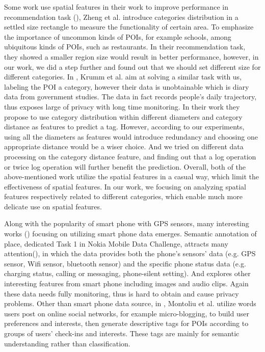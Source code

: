 Some work use spatial features in their work to improve performance in recommendation task (\cite{LocationZheng}), Zheng et al. introduce categories distribution in a settled size rectangle to measure the functionality of certain area. To emphasize the importance of uncommon kinds of POIs, for example schools, among ubiquitous kinds of POIs, such as restaurants. In their recommendation task, they showed a smaller region size would result in better performance, however, in our work, we did a step further and found out that we should set different size for different categories. In \cite{LocationPlacer}, Krumm et al. aim at solving a similar task with us, labeling the POI a category, however their data is unobtainable which is diary data from government studies. The data in fact records people's daily trajectory, thus exposes large of privacy with long time monitoring. In their work they propose to use category distribution within different diameters and category distance as features to predict a tag. However, according to our experiments, using all the diameters as features would introduce redundancy and choosing one appropriate distance would be a wiser choice. And we tried on different data processing on the category distance feature, and finding out that a log operation or twice log operation will further benefit the prediction. Overall, both of the above-mentioned work utilize the spatial features in a casual way, which limit the effectiveness of spatial features. In our work, we focusing on analyzing spatial features respectively related to different categories, which enable much more delicate use on spatial features.

Along with the popularity of smart phone with GPS sensors, many interesting works (\cite{MDCconditional,phoneImageAudio,topicmodelMDC1,MDCdescriptive}) focusing on utilizing smart phone data emerges. Semantic annotation of place, dedicated Task 1 in Nokia Mobile Data Challenge, attracts many attention(\cite{MDCconditional,topicmodelMDC1,MDCdescriptive}), in which the data provides both the phone's sensors' data (e.g. GPS sensor, Wifi sensor, bluetooth sensor) and the specific phone status data (e.g. charging status, calling or messaging, phone-silent setting). And \cite{phoneImageAudio} explores other interesting features from smart phone including images and audio clips. Again these data needs fully monitoring, thus is hard to obtain and cause privacy problems. Other than smart phone data source, in \cite{interestprofile}, Montoliu et al. utilize words users post on online social networks, for example micro-blogging, to build user preferences and interests, then generate descriptive tags for POIs according to groups of users' check-ins and interests. These tags are mainly for semantic understanding rather than classification.

